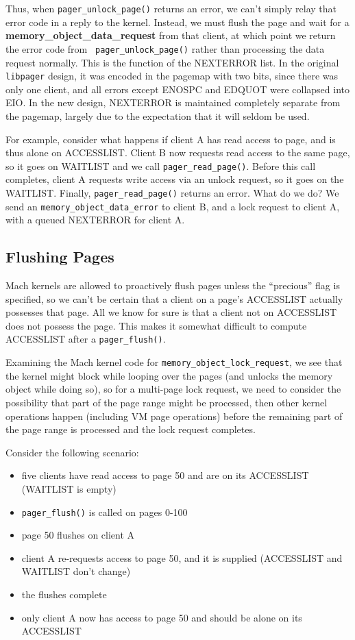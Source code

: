 \documentclass{article}
\def\libpager{{\tt libpager}\xspace}
\def\pagerflush{{\tt pager_flush()}\xspace}
\def\pagerreadpage{{\tt pager_read_page()}\xspace}
\def\molockrequest{{\tt memory_object_lock_request}\xspace}
\def\modataerror{{\tt memory_object_data_error}\xspace}
\begin{document}
Thus, when {\tt pager_unlock_page()} returns an error, we can't simply
relay that error code in a reply to the kernel.  Instead, we must
flush the page and wait for a {\bf memory_object_data_request} from
that client, at which point we return the error code from {\tt
  pager_unlock_page()} rather than processing the data request
normally.  This is the function of the NEXTERROR list.  In the
original \libpager design, it was encoded in the pagemap with two
bits, since there was only one client, and all errors except ENOSPC
and EDQUOT were collapsed into EIO.  In the new design, NEXTERROR is
maintained completely separate from the pagemap, largely due to the
expectation that it will seldom be used.

For example, consider what happens if client A has read access to
page, and is thus alone on ACCESSLIST.  Client B now requests read
access to the same page, so it goes on WAITLIST and we
call \pagerreadpage.  Before this call completes, client A requests
write access via an unlock request, so it goes on the WAITLIST.
Finally, \pagerreadpage returns an error.  What do we do?
We send an \modataerror to client B, and a lock request to
client A, with a queued NEXTERROR for client A.

\subsection{Flushing Pages}

Mach kernels are allowed to proactively flush pages unless the
``precious'' flag is specified, so we can't be certain that a client
on a page's ACCESSLIST actually possesses that page.  All we know for
sure is that a client not on ACCESSLIST does not possess the page.  This
makes it somewhat difficult to compute ACCESSLIST after a \pagerflush.

Examining the Mach kernel code for \molockrequest, we see that the kernel might block
while looping over the pages (and unlocks the memory object while doing so), so for a
multi-page lock request, we need to consider the possibility that part of the page range
might be processed, then other kernel operations happen (including VM page operations)
before the remaining part of the page range is processed and the lock request completes.

Consider the following scenario:

\begin{itemize}
\item five clients have read access to page 50 and are on its ACCESSLIST (WAITLIST is empty)
\item \pagerflush is called on pages 0-100
\item page 50 flushes on client A
\item client A re-requests access to page 50, and it is supplied (ACCESSLIST and WAITLIST don't change)
\item the flushes complete
\item only client A now has access to page 50 and should be alone on its ACCESSLIST
\end{itemize}
\end{document}
